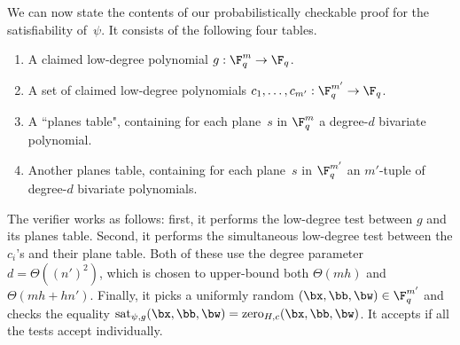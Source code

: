 \documentclass[11pt]{article}
\begin{document}
We can now state the contents of our probabilistically checkable proof for the satisfiability of~$\psi$.
It consists of the following four tables.
\begin{enumerate}
\itemsep -.5pt
\item A claimed low-degree polynomial $g:\F_q^m \rightarrow \F_q$.
\item A set of claimed low-degree polynomials $c_1, \ldots, c_{m'} : \F_q^{m'} \rightarrow \F_q$.
\item A ``planes table", containing for each plane~$s$ in $\F_q^m$ a degree-$d$ bivariate polynomial.
\item Another planes table, containing for each plane~$s$ in $\F_q^{m'}$ an $m'$-tuple of degree-$d$ bivariate polynomials.
\end{enumerate}
The verifier works as follows:
first, it performs the low-degree test between $g$ and its planes table.
Second, it performs the simultaneous low-degree test between the $c_i$'s and their plane table.
Both of these use the degree parameter $d = \Theta((n')^2)$,
which is chosen to upper-bound both $\Theta(mh)$ and $\Theta(mh + hn')$.
Finally, it picks a uniformly random $(\bx, \bb, \bw) \in \F_q^{m'}$
and checks the equality $\mathrm{sat}_{\psi,g}(\bx, \bb, \bw) = \mathrm{zero}_{H,c}(\bx, \bb, \bw)$.
It accepts if all the tests accept individually.
\end{document}
